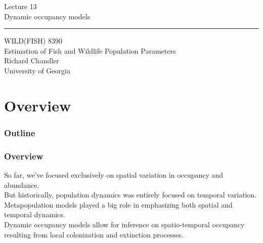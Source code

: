\documentclass[color=usenames,dvipsnames]{beamer}\usepackage[]{graphicx}\usepackage[]{color}
\begin{document}
\begin{frame}[plain]
  \LARGE
  \centering
  {\huge Lecture 13 \\ Dynamic occupancy models} \\
  {\color{default} \rule{\textwidth}{0.1pt}}
  \vfill
  \large
  WILD(FISH) 8390 \\
  Estimation of Fish and Wildlife Population Parameters \\
  \vfill
  \large
  Richard Chandler \\
  University of Georgia \\
\end{frame}






\section{Overview}



\begin{frame}[plain]
  \frametitle{Outline}
  \Large
\end{frame}



\begin{frame}
  \frametitle{Overview}
  So far, we've focused exclusively on spatial variation in occupancy
  and abundance. \\  
  \pause
  \vfill
  But historically, population dynamics was entirely focused on
  temporal variation. \\
  \pause
  \vfill
  Metapopulation models played a big role in emphasizing both spatial
  and temporal dynamics. \\
  \pause
  \vfill
  Dynamic occupancy models allow for inference on spatio-temporal
  occupancy resulting from local colonization and extinction
  processes. \\
\end{frame}
\end{document}
